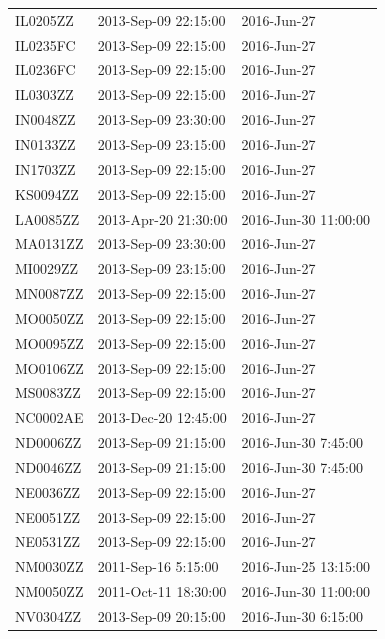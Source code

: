 \documentclass[12pt]{article}
\begin{document}
\begin{longtable}{lll}
IL0205ZZ         & 2013-Sep-09 22:15:00 & 2016-Jun-27          \\
IL0235FC         & 2013-Sep-09 22:15:00 & 2016-Jun-27          \\
IL0236FC         & 2013-Sep-09 22:15:00 & 2016-Jun-27          \\
IL0303ZZ         & 2013-Sep-09 22:15:00 & 2016-Jun-27          \\
IN0048ZZ         & 2013-Sep-09 23:30:00 & 2016-Jun-27          \\
IN0133ZZ         & 2013-Sep-09 23:15:00 & 2016-Jun-27          \\
IN1703ZZ         & 2013-Sep-09 22:15:00 & 2016-Jun-27          \\
KS0094ZZ         & 2013-Sep-09 22:15:00 & 2016-Jun-27          \\
LA0085ZZ         & 2013-Apr-20 21:30:00 & 2016-Jun-30 11:00:00 \\
MA0131ZZ         & 2013-Sep-09 23:30:00 & 2016-Jun-27          \\
MI0029ZZ         & 2013-Sep-09 23:15:00 & 2016-Jun-27          \\
MN0087ZZ         & 2013-Sep-09 22:15:00 & 2016-Jun-27          \\
MO0050ZZ         & 2013-Sep-09 22:15:00 & 2016-Jun-27          \\
MO0095ZZ         & 2013-Sep-09 22:15:00 & 2016-Jun-27          \\
MO0106ZZ         & 2013-Sep-09 22:15:00 & 2016-Jun-27          \\
MS0083ZZ         & 2013-Sep-09 22:15:00 & 2016-Jun-27          \\
NC0002AE         & 2013-Dec-20 12:45:00 & 2016-Jun-27          \\
ND0006ZZ         & 2013-Sep-09 21:15:00 & 2016-Jun-30 7:45:00  \\
ND0046ZZ         & 2013-Sep-09 21:15:00 & 2016-Jun-30 7:45:00  \\
NE0036ZZ         & 2013-Sep-09 22:15:00 & 2016-Jun-27          \\
NE0051ZZ         & 2013-Sep-09 22:15:00 & 2016-Jun-27          \\
NE0531ZZ         & 2013-Sep-09 22:15:00 & 2016-Jun-27          \\
NM0030ZZ         & 2011-Sep-16 5:15:00  & 2016-Jun-25 13:15:00 \\
NM0050ZZ         & 2011-Oct-11 18:30:00 & 2016-Jun-30 11:00:00 \\
NV0304ZZ         & 2013-Sep-09 20:15:00 & 2016-Jun-30 6:15:00  \\

\end{longtable}
\end{document}
